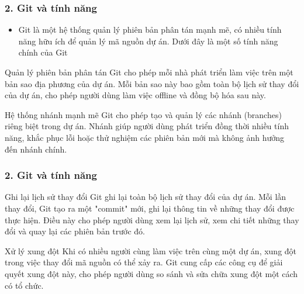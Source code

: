 \documentclass{beamer}
\begin{document}
\begin{frame}
\frametitle{ 2. Git và tính năng}

\begin{itemize}
\item Git là một hệ thống quản lý phiên bản phân tán mạnh mẽ, có nhiều tính năng hữu ích để quản lý mã nguồn dự án. Dưới đây là một số tính năng chính của Git

\end{itemize}

\begin{block}{ Quản lý phiên bản phân tán}
 Git cho phép mỗi nhà phát triển làm việc trên một bản sao địa phương của dự án. Mỗi bản sao này bao gồm toàn bộ lịch sử thay đổi của dự án, cho phép người dùng làm việc offline và đồng bộ hóa sau này.
\end{block}

\begin{block}{ Hệ thống nhánh mạnh mẽ}
 Git cho phép tạo và quản lý các nhánh (branches) riêng biệt trong dự án. Nhánh giúp người dùng phát triển đồng thời nhiều tính năng, khắc phục lỗi hoặc thử nghiệm các phiên bản mới mà không ảnh hưởng đến nhánh chính.
\end{block}

\end{frame}


\begin{frame}
\frametitle{ 2. Git và tính năng}
\begin{block}{ Ghi lại lịch sử thay đổi}
 Git ghi lại toàn bộ lịch sử thay đổi của dự án. Mỗi lần thay đổi, Git tạo ra một "commit" mới, ghi lại thông tin về những thay đổi được thực hiện. Điều này cho phép người dùng xem lại lịch sử, xem chi tiết những thay đổi và quay lại các phiên bản trước đó.
\end{block}
\begin{block}{ Xử lý xung đột}
Khi có nhiều người cùng làm việc trên cùng một dự án, xung đột trong việc thay đổi mã nguồn có thể xảy ra. Git cung cấp các công cụ để giải quyết xung đột này, cho phép người dùng so sánh và sửa chữa xung đột một cách có tổ chức.
\end{block}
\end{frame}

\end{document}
